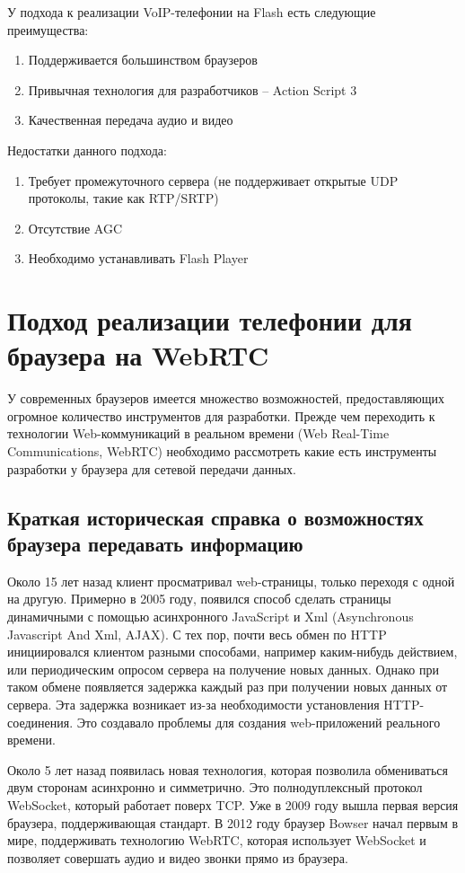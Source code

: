 У подхода к реализации VoIP-телефонии на Flash есть следующие преимущества:
\begin{enumerate}
\item Поддерживается большинством браузеров
\item Привычная технология для разработчиков – Action Script 3
\item Качественная передача аудио и видео
\end{enumerate}

Недостатки данного подхода:
\begin{enumerate}
\item Требует промежуточного сервера (не поддерживает открытые UDP протоколы, такие как RTP/SRTP)
\item Отсутствие AGC
\item Необходимо устанавливать Flash Player
\end{enumerate}

\section{Подход реализации телефонии для браузера на WebRTC}

У современных браузеров имеется множество возможностей, предоставляющих огромное количество инструментов для разработки. Прежде чем переходить к технологии Web-коммуникаций в реальном времени (Web Real-Time Communications, WebRTC) необходимо рассмотреть какие есть инструменты разработки у браузера для сетевой передачи данных.

\subsection{Краткая историческая справка о возможностях браузера передавать информацию}

Около 15 лет назад клиент просматривал web-страницы, только переходя с одной на другую. Примерно в 2005 году, появился способ сделать страницы динамичными с помощью асинхронного JavaScript и Xml (Asynchronous Javascript And Xml, AJAX). С тех пор, почти весь обмен по HTTP инициировался клиентом разными способами, например каким-нибудь действием, или периодическим опросом сервера на получение новых данных. Однако при таком обмене появляется задержка каждый раз при получении новых данных от сервера. Эта задержка возникает из-за необходимости установления HTTP-соединения. Это создавало проблемы для создания web-приложений реального времени.\cite{ajax_problem}

Около 5 лет назад появилась новая технология, которая позволила обмениваться двум сторонам асинхронно и симметрично. Это полнодуплексный протокол WebSocket, который работает поверх TCP. Уже в 2009 году вышла первая версия браузера, поддерживающая стандарт.\cite{web_socket_begining} В 2012 году браузер Bowser начал первым в мире, поддерживать технологию WebRTC, которая использует WebSocket и позволяет совершать аудио и видео звонки прямо из браузера.\cite{bowser}

